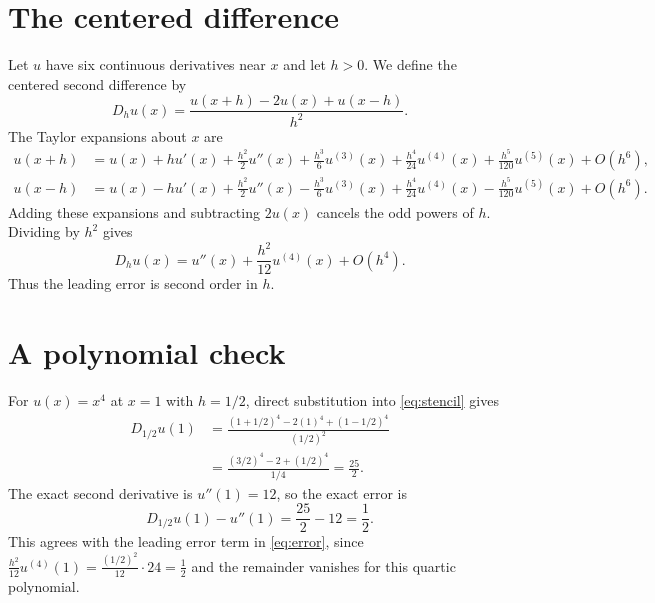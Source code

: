\section{The centered difference}
Let $u$ have six continuous derivatives near $x$ and let $h>0$.
We define the centered second difference by
\begin{equation}\label{eq:stencil}
 D_h u(x)=\frac{u(x+h)-2u(x)+u(x-h)}{h^2}.
\end{equation}
The Taylor expansions about $x$ are
\begin{align*}
 u(x+h)&=u(x)+h u'(x)+\frac{h^2}{2}u''(x)+\frac{h^3}{6}u^{(3)}(x)
 +\frac{h^4}{24}u^{(4)}(x)+\frac{h^5}{120}u^{(5)}(x)+O(h^6),\\
 u(x-h)&=u(x)-h u'(x)+\frac{h^2}{2}u''(x)-\frac{h^3}{6}u^{(3)}(x)
 +\frac{h^4}{24}u^{(4)}(x)-\frac{h^5}{120}u^{(5)}(x)+O(h^6).
\end{align*}
Adding these expansions and subtracting $2u(x)$ cancels the odd powers of $h$. Dividing by $h^2$ gives
\begin{equation}\label{eq:error}
 D_h u(x)=u''(x)+\frac{h^2}{12}u^{(4)}(x)+O(h^4).
\end{equation}
Thus the leading error is second order in $h$.
\section{A polynomial check}
For $u(x)=x^4$ at $x=1$ with $h=1/2$, direct substitution into
\eqref{eq:stencil} gives
\begin{align*}
 D_{1/2}u(1)
 &=\frac{(1+1/2)^4-2(1)^4+(1-1/2)^4}{(1/2)^2}\\
 &=\frac{(3/2)^4-2+(1/2)^4}{1/4}
 =\frac{25}{2}.
\end{align*}
The exact second derivative is $u''(1)=12$, so the exact error is
\[
 D_{1/2}u(1)-u''(1)=\frac{25}{2}-12=\frac{1}{2}.
\]
This agrees with the leading error term in \eqref{eq:error}, since
$\frac{h^2}{12}u^{(4)}(1)=\frac{(1/2)^2}{12}\cdot 24=\frac{1}{2}$ and the remainder vanishes for this quartic polynomial.